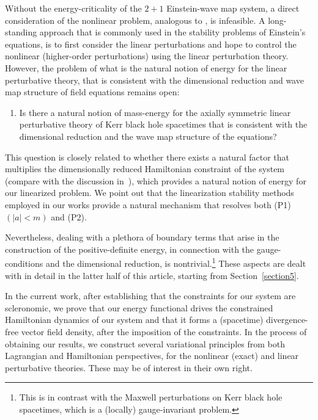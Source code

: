 \documentclass[pdftex]{sigma}
\numberwithin{equation}{section}
\begin{document}
Without the energy-criticality of the $2 + 1$ Einstein-wave map system, a direct consideration of the nonlinear problem, analogous to \cite{AGS_15, diss_13}, is infeasible. A long-standing approach that is commonly used in the stability problems of Einstein's equations, is to first consider the linear perturbations and hope to control the nonlinear (higher-order perturbations) using the linear perturbation theory.
However, the problem of what is the natural notion of energy for the linear perturbative theory, that is consistent with the dimensional reduction and wave map structure of field equations remains open:
\begin{enumerate}\setlength{\leftskip}{0.03cm}
\item[(P2)] Is there a natural notion of mass-energy for the axially symmetric linear perturbative theory of Kerr black hole spacetimes that is consistent with the dimensional reduction and the wave map structure of the equations?
\end{enumerate}

This question is closely related to whether there exists a natural factor that multiplies the dimensionally reduced Hamiltonian constraint
of the system (compare with the discussion in~\mbox{\cite[pp.~3--4]{NG17}}), which provides a natural notion of energy for our linearized problem.
We point out that the linearization stability methods employed in our works provide a natural mechanism that resolves both (P1) $(\vert a \vert < m)$ and (P2).

Nevertheless, dealing with a plethora of boundary terms that arise in the construction of the positive-definite energy, in connection with the gauge-conditions and the dimensional reduction, is nontrivial.\footnote{This is in contrast with the Maxwell perturbations on Kerr black hole spacetimes, which is a (locally) gauge-invariant problem.} These aspects are dealt with in detail in the latter half of this article, starting from Section~\ref{section5}.

In the current work, after establishing that the constraints for our system are scleronomic,
we prove that our energy functional drives the constrained Hamiltonian dynamics of our system
and that it forms a (spacetime) divergence-free vector field density, after the imposition of the constraints.
In the process of obtaining our results, we construct several variational principles from both Lagrangian and Hamiltonian perspectives, for the nonlinear (exact) and linear perturbative theories. These may be of interest in their own right.
\end{document}
